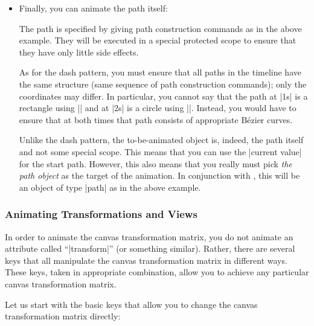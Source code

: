 \begin{itemize}
\item Finally, you can animate the path itself:
\begin{codeexample}[width=2.3cm]
\end{codeexample}
  The path is specified by giving path construction commands as in the
  above example. They will be executed in a special protected scope to
  ensure that they have only little side effects.

  As for the dash pattern, you must ensure that all paths in the
  timeline have the same structure (same sequence of path construction
  commands); only the coordinates may differ. In particular, you
  cannot say that the path at |1s| is a rectangle using
  |\pgfpathrectangle| and at |2s| is a circle using
  |\pgfpathcircle|. Instead, you would have to ensure that at both
  times that path consists of appropriate Bézier curves.

  Unlike the dash pattern, the to-be-animated object is, indeed, the
  path itself and not some special scope. This means that you can use
  the |current value| for the start path. However, this also means
  that you really must pick \emph{the path object} as the target of
  the animation. In conjunction with \tikzname, this will be an object
  of type |path| as in the above example.
\end{itemize}



\subsubsection{Animating Transformations  and Views}
\label{section-base-animation-views}


In order to animate the canvas transformation matrix, you do not
animate an attribute called ``|transform|'' (or something
similar). Rather, there are several keys that all manipulate the
canvas transformation matrix in 
different ways. These keys, taken in appropriate combination, allow
you to achieve any particular canvas transformation matrix.

Let us start with the basic keys that allow you to change the
canvas transformation matrix directly:

